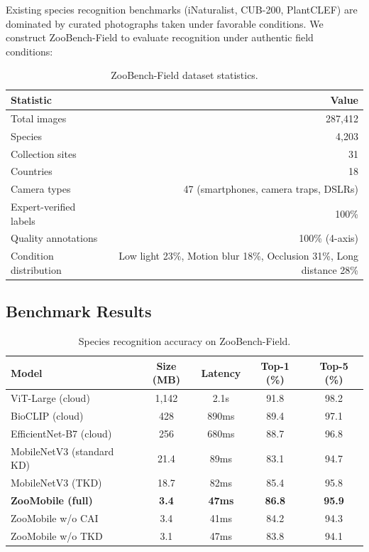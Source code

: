 \documentclass[11pt,a4paper]{article}
\begin{document}
Existing species recognition benchmarks (iNaturalist, CUB-200, PlantCLEF) are dominated by curated photographs taken under favorable conditions.
We construct ZooBench-Field to evaluate recognition under authentic field conditions:

\begin{table}[H]
\centering
\caption{ZooBench-Field dataset statistics.}
\label{tab:zoobench}
\begin{tabular}{@{}lr@{}}
\toprule
\textbf{Statistic} & \textbf{Value} \\
\midrule
Total images & 287,412 \\
Species & 4,203 \\
Collection sites & 31 \\
Countries & 18 \\
Camera types & 47 (smartphones, camera traps, DSLRs) \\
Expert-verified labels & 100\% \\
Quality annotations & 100\% (4-axis) \\
Condition distribution & Low light 23\%, Motion blur 18\%, Occlusion 31\%, Long distance 28\% \\
\bottomrule
\end{tabular}
\end{table}

\subsection{Benchmark Results}

\begin{table}[H]
\centering
\caption{Species recognition accuracy on ZooBench-Field.}
\label{tab:benchmark_results}
\begin{tabular}{@{}lcccc@{}}
\toprule
\textbf{Model} & \textbf{Size (MB)} & \textbf{Latency} & \textbf{Top-1 (\%)} & \textbf{Top-5 (\%)} \\
\midrule
ViT-Large (cloud) & 1,142 & 2.1s & 91.8 & 98.2 \\
BioCLIP (cloud) & 428 & 890ms & 89.4 & 97.1 \\
EfficientNet-B7 (cloud) & 256 & 680ms & 88.7 & 96.8 \\
MobileNetV3 (standard KD) & 21.4 & 89ms & 83.1 & 94.7 \\
MobileNetV3 (TKD) & 18.7 & 82ms & 85.4 & 95.8 \\
\textbf{ZooMobile (full)} & \textbf{3.4} & \textbf{47ms} & \textbf{86.8} & \textbf{95.9} \\
ZooMobile w/o CAI & 3.4 & 41ms & 84.2 & 94.3 \\
ZooMobile w/o TKD & 3.1 & 47ms & 83.8 & 94.1 \\
\bottomrule
\end{tabular}
\end{table}
\end{document}
